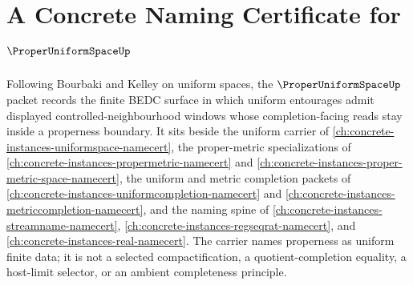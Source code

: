 \chapter{A Concrete Naming Certificate for $\ProperUniformSpaceUp$}
\label{ch:concrete-instances-proper-uniform-space-namecert}

Following Bourbaki and Kelley on uniform spaces, the $\ProperUniformSpaceUp$ packet records the finite BEDC surface in which uniform entourages admit displayed controlled-neighbourhood windows whose completion-facing reads stay inside a properness boundary. It sits beside the uniform carrier of \autoref{ch:concrete-instances-uniformspace-namecert}, the proper-metric specializations of \autoref{ch:concrete-instances-propermetric-namecert} and \autoref{ch:concrete-instances-proper-metric-space-namecert}, the uniform and metric completion packets of \autoref{ch:concrete-instances-uniformcompletion-namecert} and \autoref{ch:concrete-instances-metriccompletion-namecert}, and the naming spine of \autoref{ch:concrete-instances-streamname-namecert}, \autoref{ch:concrete-instances-regseqrat-namecert}, and \autoref{ch:concrete-instances-real-namecert}. The carrier names properness as uniform finite data; it is not a selected compactification, a quotient-completion equality, a host-limit selector, or an ambient completeness principle.

